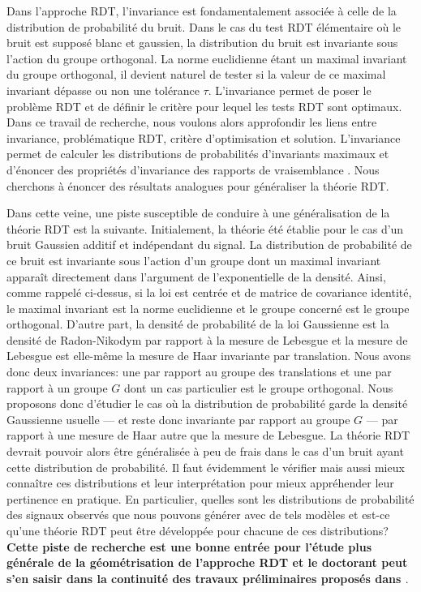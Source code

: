 \documentclass[a4paper, 10pt]{article}
\begin{document}
Dans l'approche RDT, l'invariance est fondamentalement associée à celle de la distribution de probabilité du bruit. Dans le cas du test RDT élémentaire où le bruit est supposé blanc et gaussien, la distribution du bruit est invariante sous l'action du groupe orthogonal. La norme euclidienne étant un maximal invariant du groupe orthogonal, il devient naturel de tester si la valeur de ce maximal invariant dépasse ou non une tolérance $\tau$. L'invariance permet de poser le problème RDT et de définir le critère pour lequel les tests RDT sont optimaux. Dans ce travail de recherche, nous voulons alors approfondir les liens entre invariance, problématique RDT, critère d'optimisation et solution. L'invariance permet de calculer les distributions de probabilités d'invariants maximaux et d'énoncer des propriétés d'invariance des rapports de vraisemblance \cite{l.eatonMultivariateStatisticsVector2007, kariya1989}. Nous cherchons à énoncer des résultats analogues pour généraliser la théorie RDT.

Dans cette veine, une piste susceptible de conduire à une généralisation de la théorie RDT est la suivante. Initialement, la théorie été établie pour le cas d'un bruit Gaussien additif et indépendant du signal. La distribution de probabilité de ce bruit est invariante sous l'action d'un groupe dont un maximal invariant apparaît directement dans l'argument de l'exponentielle de la densité. Ainsi, comme rappelé ci-dessus, si la loi est centrée et de matrice de covariance identité, le maximal invariant est la norme euclidienne et le groupe concerné est le groupe orthogonal. D'autre part, la densité de probabilité de la loi Gaussienne est la densité de Radon-Nikodym par rapport à la mesure de Lebesgue et la mesure de Lebesgue est elle-même la mesure de Haar invariante par translation. Nous avons donc deux invariances: une par rapport au groupe des translations et une par rapport à un groupe $G$ dont un cas particulier est le groupe orthogonal. Nous proposons donc d'étudier le cas où la distribution de probabilité garde la densité Gaussienne usuelle --- et reste donc invariante par rapport au groupe $G$ --- par rapport à une mesure de Haar autre que la mesure de Lebesgue. La théorie RDT devrait pouvoir alors être généralisée à peu de frais dans le cas d'un bruit ayant cette distribution de probabilité. Il faut évidemment le vérifier mais aussi mieux connaître ces distributions et leur interprétation pour mieux appréhender leur pertinence en pratique. En particulier, quelles sont les distributions de probabilité des signaux observés que nous pouvons générer avec de tels modèles et est-ce qu'une théorie RDT peut être développée pour chacune de ces distributions? \textbf{Cette piste de recherche est une bonne entrée pour l'étude plus générale de la géométrisation de l'approche RDT et le doctorant peut s'en saisir dans la continuité des travaux préliminaires proposés dans \cite{ansel2021, bourmaniBinaryDecisionObservations2020}}.
\end{document}
